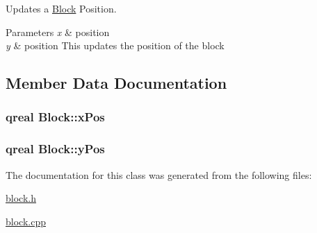 Updates a \hyperlink{class_block}{Block} Position. 


\begin{DoxyParams}{Parameters}
{\em x} & position \\
\hline
{\em y} & position This updates the position of the block \\
\hline
\end{DoxyParams}


\subsection{Member Data Documentation}
\hypertarget{class_block_a97b5b28230920e5f6e3335a023628477}{
\subsubsection[{x\-Pos}]{\setlength{\rightskip}{0pt plus 5cm}qreal Block\-::x\-Pos\hspace{0.3cm}{\ttfamily [protected]}}}\label{class_block_a97b5b28230920e5f6e3335a023628477}
\hypertarget{class_block_a0857435a94babc54051428becff56867}{
\subsubsection[{y\-Pos}]{\setlength{\rightskip}{0pt plus 5cm}qreal Block\-::y\-Pos\hspace{0.3cm}{\ttfamily [protected]}}}\label{class_block_a0857435a94babc54051428becff56867}


The documentation for this class was generated from the following files\-:\begin{DoxyCompactItemize}
\item 
\hyperlink{block_8h}{block.\-h}\item 
\hyperlink{block_8cpp}{block.\-cpp}\end{DoxyCompactItemize}

